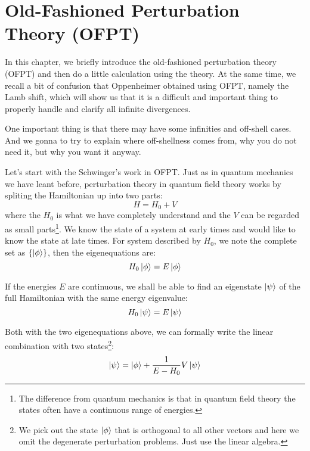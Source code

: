 \documentclass[12pt,openany]{book}
\begin{document}
	
	
	
	
	
	
	
	\chapter{Old-Fashioned Perturbation Theory (OFPT)}
	In this chapter, we briefly introduce the old-fashioned perturbation theory (OFPT) and then do a little calculation using the theory.
	At the same time, we recall a bit of confusion that Oppenheimer obtained using OFPT, namely the Lamb shift, which will show us that it is a difficult and important thing to
	properly handle and clarify all infinite divergences.\par 
	One important thing is that there may have some infinities and off-shell cases. And we gonna to try to explain where off-shellness comes from, why you do not need it, but why you want it anyway.\par 
	Let's start with the Schwinger's work in OFPT. Just as in quantum mechanics we have leant before, perturbation theory in quantum field theory works by spliting the Hamiltonian up into two parts:
	\begin{equation}
		H=H_0+V
	\end{equation}
	where the $H_0$ is what we have completely understand and the $V$ can be regarded as small parts\footnote{The difference from quantum mechanics is that in quantum field theory the states often have a continuous range of energies.}.
	We know the state of a system at early times and would like to know the state at late times. For system described by $H_0$, we note the 
	complete set as $\{\ket{\phi}\}$, then the eigenequations are:
	\begin{equation}
		H_0\ket{\phi}=E\ket{\phi}
	\end{equation}\par 
	If the energies $E$ are continuous, we shall be able to find an eigenstate $\ket{\psi}$ of the full Hamiltonian with the same energy eigenvalue:
	\begin{equation}
		H_0\ket{\psi}=E\ket{\psi}
	\end{equation}\par 
	Both with the two eigenequations above, we can formally write the linear combination with two states\footnote{We pick out the state $\ket{\phi}$ that is orthogonal to all other vectors and here we omit the degenerate perturbation problems. Just use the linear algebra.}:
	\begin{equation}
		\ket{\psi}=\ket{\phi}+\frac{1}{E-H_0}V\ket{\psi}
	\end{equation}
\end{document}
